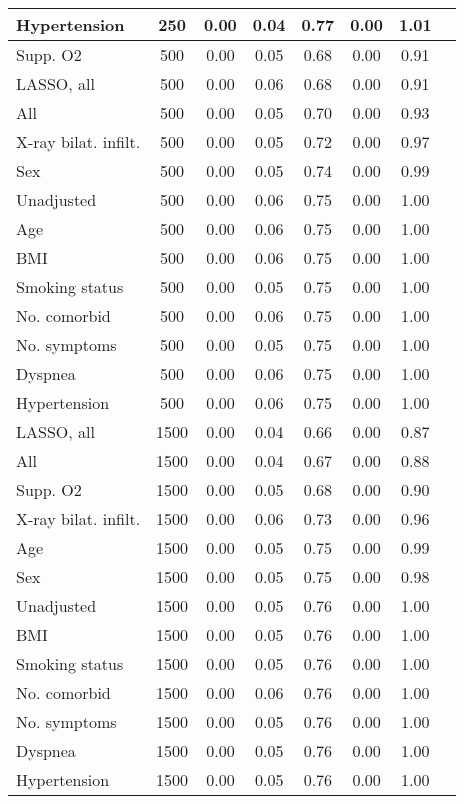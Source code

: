 \documentclass{article}
\begin{document}
{\begin{longtable}{lccccccc}
Hypertension & 250 & 0.00 & 0.04 & 0.77 & 0.00 & 1.01 \\ \midrule 
Supp. O2 & 500 & 0.00 & 0.05 & 0.68 & 0.00 & 0.91 \\ 
LASSO, all & 500 & 0.00 & 0.06 & 0.68 & 0.00 & 0.91 \\ 
All & 500 & 0.00 & 0.05 & 0.70 & 0.00 & 0.93 \\ 
X-ray bilat. infilt. & 500 & 0.00 & 0.05 & 0.72 & 0.00 & 0.97 \\ 
Sex & 500 & 0.00 & 0.05 & 0.74 & 0.00 & 0.99 \\ 
Unadjusted & 500 & 0.00 & 0.06 & 0.75 & 0.00 & 1.00 \\ 
Age & 500 & 0.00 & 0.06 & 0.75 & 0.00 & 1.00 \\ 
BMI & 500 & 0.00 & 0.06 & 0.75 & 0.00 & 1.00 \\ 
Smoking status & 500 & 0.00 & 0.05 & 0.75 & 0.00 & 1.00 \\ 
No. comorbid & 500 & 0.00 & 0.06 & 0.75 & 0.00 & 1.00 \\ 
No. symptoms & 500 & 0.00 & 0.05 & 0.75 & 0.00 & 1.00 \\ 
Dyspnea & 500 & 0.00 & 0.06 & 0.75 & 0.00 & 1.00 \\ 
Hypertension & 500 & 0.00 & 0.06 & 0.75 & 0.00 & 1.00 \\ \midrule 
LASSO, all & 1500 & 0.00 & 0.04 & 0.66 & 0.00 & 0.87 \\ 
All & 1500 & 0.00 & 0.04 & 0.67 & 0.00 & 0.88 \\ 
Supp. O2 & 1500 & 0.00 & 0.05 & 0.68 & 0.00 & 0.90 \\ 
X-ray bilat. infilt. & 1500 & 0.00 & 0.06 & 0.73 & 0.00 & 0.96 \\ 
Age & 1500 & 0.00 & 0.05 & 0.75 & 0.00 & 0.99 \\ 
Sex & 1500 & 0.00 & 0.05 & 0.75 & 0.00 & 0.98 \\ 
Unadjusted & 1500 & 0.00 & 0.05 & 0.76 & 0.00 & 1.00 \\ 
BMI & 1500 & 0.00 & 0.05 & 0.76 & 0.00 & 1.00 \\ 
Smoking status & 1500 & 0.00 & 0.05 & 0.76 & 0.00 & 1.00 \\ 
No. comorbid & 1500 & 0.00 & 0.06 & 0.76 & 0.00 & 1.00 \\ 
No. symptoms & 1500 & 0.00 & 0.05 & 0.76 & 0.00 & 1.00 \\ 
Dyspnea & 1500 & 0.00 & 0.05 & 0.76 & 0.00 & 1.00 \\ 
Hypertension & 1500 & 0.00 & 0.05 & 0.76 & 0.00 & 1.00 \\
\bottomrule
\hline
\end{longtable}
}
\end{document}
